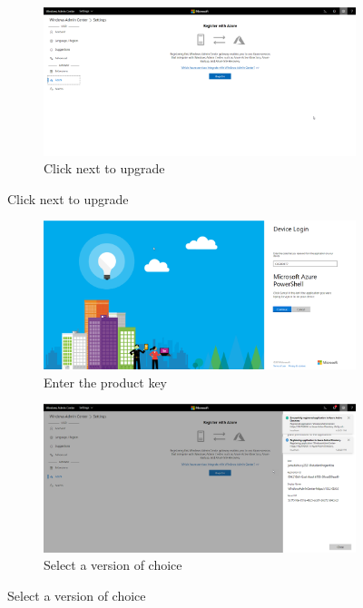 \label{WACAzure}
\begin{figure}[h]
	\begin{subfigure}{\textwidth}
		\includegraphics[width=0.9\linewidth]{img/WAC_Azure_1.png}
		\captionsetup{width=0.8\linewidth}
		\centering		
		\caption{Click next to upgrade}
		\label{fig:WACAzure1}
	\end{subfigure}
\end{figure}
\begin{figure}[h]
	\begin{subfigure}{0.5\textwidth}
		\captionsetup{width=0.8\linewidth}
		\includegraphics[width=0.9\linewidth]{img/WAC_Azure_2.png}
		\centering
		\caption{Enter the product key}
		\label{fig:WACAzure2}
	\end{subfigure}
	\begin{subfigure}{0.5\textwidth}
		\captionsetup{width=0.8\linewidth}
		\includegraphics[width=0.9\linewidth]{img/WAC_Azure_3.png} 
		\centering
		\caption{Select a version of choice}
		\label{fig:WACAzure3}
	\end{subfigure}
\end{figure}
